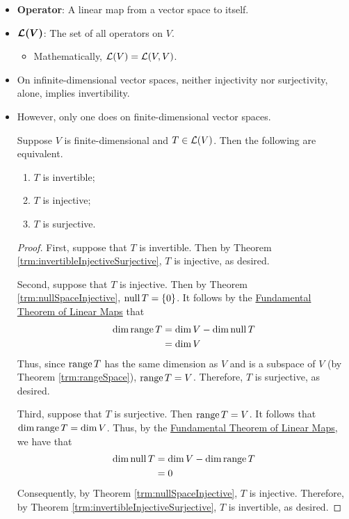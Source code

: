 \documentclass[../main.tex]{subfiles}
\begin{document}
\begin{itemize}
    \item \textbf{Operator}: A linear map from a vector space to itself.
    \item $\bm{\mathcal{L}(V)}$: The set of all operators on $V$.
    \begin{itemize}
        \item Mathematically, $\mathcal{L}(V)=\mathcal{L}(V,V)$.
    \end{itemize}
    \item On infinite-dimensional vector spaces, neither injectivity nor surjectivity, alone, implies invertibility.
    \item However, only one does on finite-dimensional vector spaces.
    \begin{theorem}
        Suppose $V$ is finite-dimensional and $T\in\mathcal{L}(V)$. Then the following are equivalent.
        \begin{enumerate}[label={\textup{(}\alph*\textup{)}}]
            \item $T$ is invertible;
            \item $T$ is injective;
            \item $T$ is surjective.
        \end{enumerate}
        \begin{proof}
            First, suppose that $T$ is invertible. Then by Theorem \ref{trm:invertibleInjectiveSurjective}, $T$ is injective, as desired.\par
            Second, suppose that $T$ is injective. Then by Theorem \ref{trm:nullSpaceInjective}, $\operatorname{null} T=\{0\}$. It follows by the \hyperref[trm:fundamentalTheoremLinearMaps]{Fundamental Theorem of Linear Maps} that
            \begin{align*}
                \dim\operatorname{range} T &= \dim V-\dim\operatorname{null} T\\
                &= \dim V
            \end{align*}
            Thus, since $\operatorname{range} T$ has the same dimension as $V$ and is a subspace of $V$ (by Theorem \ref{trm:rangeSpace}), $\operatorname{range} T=V$. Therefore, $T$ is surjective, as desired.\par
            Third, suppose that $T$ is surjective. Then $\operatorname{range} T=V$. It follows that $\dim\operatorname{range} T=\dim V$. Thus, by the \hyperref[trm:fundamentalTheoremLinearMaps]{Fundamental Theorem of Linear Maps}, we have that
            \begin{align*}
                \dim\operatorname{null} T &= \dim V-\dim\operatorname{range} T\\
                &= 0
            \end{align*}
            Consequently, by Theorem \ref{trm:nullSpaceInjective}, $T$ is injective. Therefore, by Theorem \ref{trm:invertibleInjectiveSurjective}, $T$ is invertible, as desired.
        \end{proof}
    \end{theorem}
\end{itemize}
\end{document}
